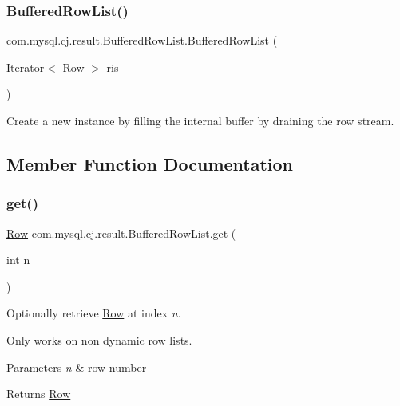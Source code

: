 \subsubsection{\texorpdfstring{Buffered\+Row\+List()}{BufferedRowList()}\hspace{0.1cm}{\footnotesize\ttfamily [2/2]}}
{\footnotesize\ttfamily com.\+mysql.\+cj.\+result.\+Buffered\+Row\+List.\+Buffered\+Row\+List (\begin{DoxyParamCaption}\item[{Iterator$<$ \mbox{\hyperlink{interfacecom_1_1mysql_1_1cj_1_1result_1_1_row}{Row}} $>$}]{ris }\end{DoxyParamCaption})}

Create a new instance by filling the internal buffer by draining the row stream. 

\subsection{Member Function Documentation}
\mbox{\label{classcom_1_1mysql_1_1cj_1_1result_1_1_buffered_row_list_a84d3adb0ccd22e7ea988a25a6421948a}} 
\subsubsection{\texorpdfstring{get()}{get()}}
{\footnotesize\ttfamily \mbox{\hyperlink{interfacecom_1_1mysql_1_1cj_1_1result_1_1_row}{Row}} com.\+mysql.\+cj.\+result.\+Buffered\+Row\+List.\+get (\begin{DoxyParamCaption}\item[{int}]{n }\end{DoxyParamCaption})}

Optionally retrieve \mbox{\hyperlink{interfacecom_1_1mysql_1_1cj_1_1result_1_1_row}{Row}} at index {\itshape n}.

Only works on non dynamic row lists.


\begin{DoxyParams}{Parameters}
{\em n} & row number \\
\hline
\end{DoxyParams}
\begin{DoxyReturn}{Returns}
\mbox{\hyperlink{interfacecom_1_1mysql_1_1cj_1_1result_1_1_row}{Row}} 
\end{DoxyReturn}


